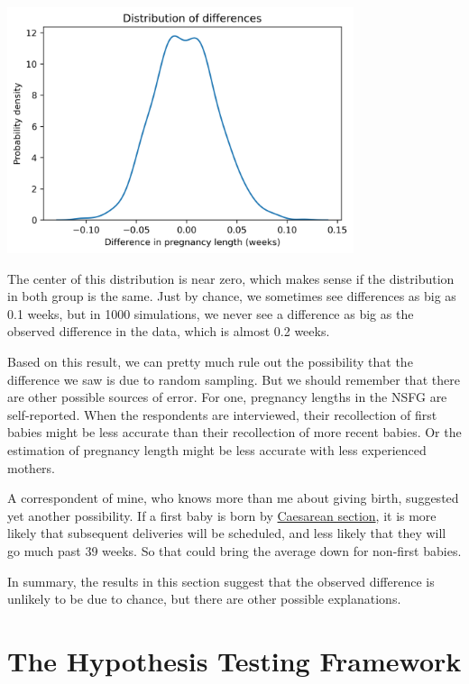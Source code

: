 \begin{center}
\includegraphics[width=4in]{chapters/13_hypothesis_files/13_hypothesis_65_0.png}
\end{center}

The center of this distribution is near zero, which makes sense if the
distribution in both group is the same. Just by chance, we sometimes see
differences as big as 0.1 weeks, but in 1000 simulations, we never see a
difference as big as the observed difference in the data, which is
almost 0.2 weeks.

Based on this result, we can pretty much rule out the possibility that
the difference we saw is due to random sampling. But we should remember
that there are other possible sources of error. For one, pregnancy
lengths in the NSFG are self-reported. When the respondents are
interviewed, their recollection of first babies might be less accurate
than their recollection of more recent babies. Or the estimation of
pregnancy length might be less accurate with less experienced mothers.

A correspondent of mine, who knows more than me about giving birth,
suggested yet another possibility. If a first baby is born by
\href{https://en.wikipedia.org/wiki/Caesarean_section}{Caesarean
section}, it is more likely that subsequent deliveries will be
scheduled, and less likely that they will go much past 39 weeks. So that
could bring the average down for non-first babies.

In summary, the results in this section suggest that the observed
difference is unlikely to be due to chance, but there are other possible
explanations.

\hypertarget{the-hypothesis-testing-framework}{%
\section{The Hypothesis Testing
Framework}\label{the-hypothesis-testing-framework}}

